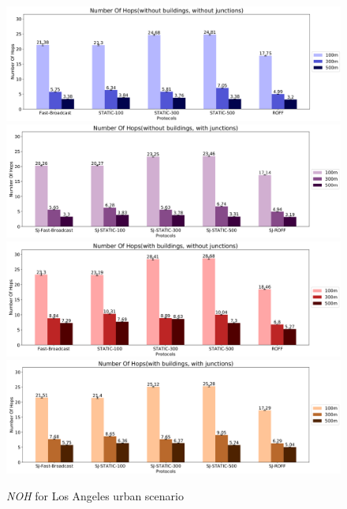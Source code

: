		\begin{figure}[H]
			\centering
			\includegraphics[width=1.0\textwidth]{immagini/la-25/b0/j0/noh}
			\includegraphics[width=1.0\textwidth]{immagini/la-25/b0/j1/noh}
			\includegraphics[width=1.0\textwidth]{immagini/la-25/b1/j0/noh}
			\includegraphics[width=1.0\textwidth]{immagini/la-25/b1/j1/noh}
			\caption{\textit{NOH} for Los Angeles urban scenario}
			\label{fig:la-25-noh}
		\end{figure}

